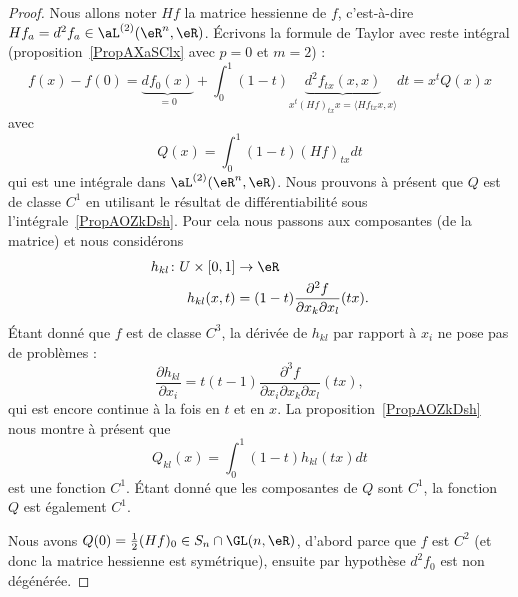 \begin{proof}
	Nous allons noter \( Hf\) la matrice hessienne de \( f\), c'est-à-dire \( Hf_a=d^2f_a\in\aL^{(2)}(\eR^n,\eR)\). Écrivons la formule de Taylor avec reste intégral (proposition~\ref{PropAXaSClx} avec \( p=0\) et \( m=2\)) :
	\begin{equation}
		f(x)-f(0)=\underbrace{df_0(x)}_{=0}+\int_0^1(1-t)\underbrace{d^2f_{tx}(x,x)}_{x^t(Hf)_{tx}x=\langle Hf_{tx}x, x\rangle }dt=x^tQ(x)x
	\end{equation}
	avec
	\begin{equation}
		Q(x)=\int_0^1(1-t)(Hf)_{tx}dt
	\end{equation}
	qui est une intégrale dans \( \aL^{(2)}(\eR^n,\eR)\). Nous prouvons à présent que \( Q\) est de classe \( C^1\) en utilisant le résultat de différentiabilité sous l'intégrale~\ref{PropAOZkDsh}. Pour cela nous passons aux composantes (de la matrice) et nous considérons
	\begin{equation}
		\begin{aligned}
			h_{kl}\colon U\times\mathopen[ 0 , 1 \mathclose] & \to \eR                                                      \\
			h_{kl}(x,t)                                      & =(1-t)\frac{ \partial^2f  }{ \partial x_k\partial x_l }(tx).
		\end{aligned}
	\end{equation}
	Étant donné que \( f\) est de classe \( C^3\), la dérivée de \( h_{kl}\) par rapport à \( x_i\) ne pose pas de problèmes :
	\begin{equation}
		\frac{ \partial h_{kl} }{ \partial x_i }=t(t-1)\frac{ \partial^3f  }{ \partial x_i\partial x_k\partial x_l }(tx),
	\end{equation}
	qui est encore continue à la fois en \( t\) et en \( x\). La proposition~\ref{PropAOZkDsh} nous montre à présent que
	\begin{equation}
		Q_{kl}(x)=\int_0^1(1-t)h_{kl}(tx)dt
	\end{equation}
	est une fonction \( C^1\). Étant donné que les composantes de \( Q\) sont \( C^1\), la fonction \( Q\) est également \( C^1\).

	Nous avons \( Q(0)=\frac{ 1 }{2}(Hf)_0\in S_n\cap \GL(n,\eR)\), d'abord parce que \( f\) est \( C^2\) (et donc la matrice hessienne est symétrique), ensuite par hypothèse \( d^2f_0\) est non dégénérée.


\end{proof}
